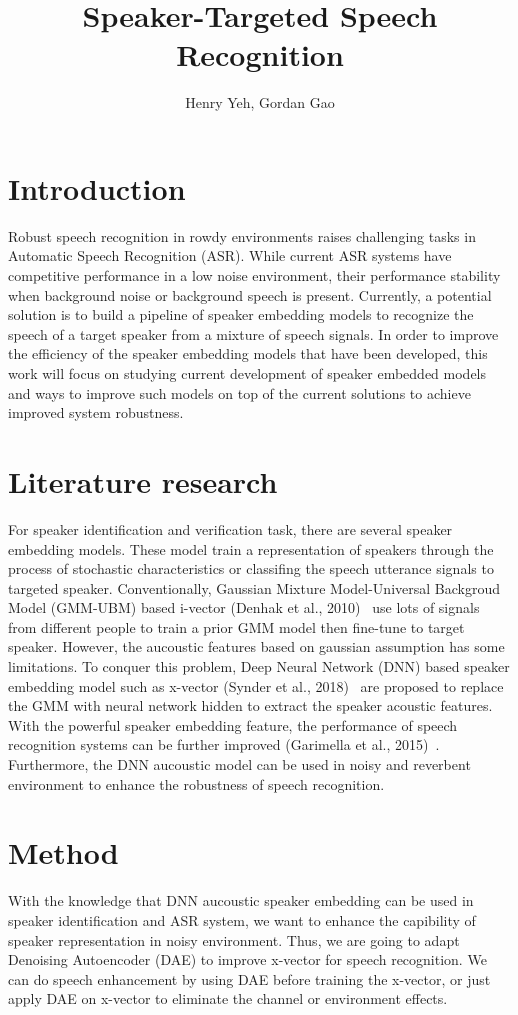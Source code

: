 \documentclass{article}%
\title{Speaker-Targeted Speech Recognition}
\author{Henry Yeh, Gordan Gao}
\begin{document}
\maketitle
\section{Introduction}
Robust speech recognition in rowdy environments raises challenging tasks in Automatic Speech Recognition (ASR). 
While current ASR systems have competitive performance in a low noise environment, 
their performance stability when background noise or background speech is present. 
Currently, a potential solution is to build a pipeline of speaker embedding models to recognize the speech of a target speaker from a mixture of speech signals. 
In order to improve the efficiency of the speaker embedding models that have been developed, 
this work will focus on studying current development of speaker embedded models and ways to improve such models on top of the current solutions to achieve improved system robustness.

\section{Literature research}
For speaker identification and verification task, there are several speaker embedding models. 
These model train a representation of speakers through the process of stochastic characteristics or classifing the speech utterance signals to targeted speaker.
Conventionally, Gaussian Mixture Model-Universal Backgroud Model (GMM-UBM) based i-vector (Denhak et al., 2010)~\cite{dehak2010front} use lots of signals from different people to train a prior GMM model then fine-tune to target speaker. 
However, the aucoustic features based on gaussian assumption has some limitations. 
To conquer this problem, Deep Neural Network (DNN) based speaker embedding model such as x-vector (Synder et al., 2018)~\cite{snyder2018x} are proposed to replace the GMM with neural network hidden to extract the speaker acoustic features.
With the powerful speaker embedding feature, the performance of speech recognition systems can be further improved (Garimella et al., 2015)~\cite{garimella2015robust}. 
Furthermore, the DNN aucoustic model can be used in noisy and reverbent environment to enhance the robustness of speech recognition.

\section{Method}
With the knowledge that DNN aucoustic speaker embedding can be used in speaker identification and ASR system, 
we want to enhance the capibility of speaker representation in noisy environment. 
Thus, we are going to adapt Denoising Autoencoder (DAE) to improve x-vector for speech recognition.
We can do speech enhancement by using DAE before training the x-vector, or just apply DAE on x-vector to eliminate the channel or environment effects.
\end{document}
